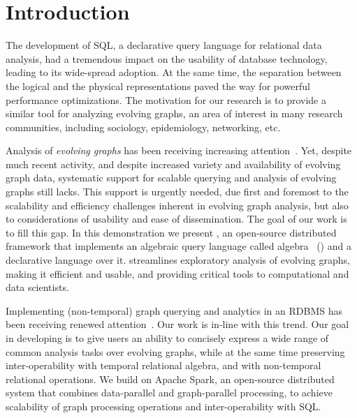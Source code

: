 \section{Introduction}
\label{sec:intro}

The development of SQL, a declarative query language for relational
data analysis, had a tremendous impact on the usability of database
technology, leading to its wide-spread adoption. At the same time, the
separation between the logical and the physical representations paved
the way for powerful performance optimizations. The motivation for our
research is to provide a similar tool for analyzing evolving graphs,
an area of interest in many research communities, including sociology,
epidemiology, networking, etc.

Analysis of {\em evolving graphs} has been receiving increasing
attention~\cite{DBLP:journals/csur/AggarwalS14,Miao2015,Ren2011,Semertzidis2015}.
Yet, despite much recent activity, and despite increased variety and
availability of evolving graph data, systematic support for scalable
querying and analysis of evolving graphs still lacks.  This support is
urgently needed, due first and foremost to the scalability and
efficiency challenges inherent in evolving graph analysis, but also to
considerations of usability and ease of dissemination.  The goal of
our work is to fill this gap.  In this demonstration we present
\sys, an open-source distributed framework that implements an
algebraic query language called \tg algebra~\cite{PortalarXiv2016}
(\tga) and a declarative language \ql over it. \sys streamlines
exploratory analysis of evolving graphs, making it efficient and
usable, and providing critical tools to computational and data
scientists.

Implementing (non-temporal) graph querying and analytics in an RDBMS
has been receiving renewed
attention~\cite{DBLP:conf/sigmod/AbergerTOR16,DBLP:conf/sigmod/SunFSKHX15,DBLP:journals/pvldb/Xirogiannopoulos15}.
Our work is in-line with this trend.  Our goal in developing \sys is
to give users an ability to concisely express a wide range of common
analysis tasks over evolving graphs, while at the same time preserving
inter-operability with temporal relational algebra, and with
non-temporal relational operations.  We build on Apache Spark, an
open-source distributed system that combines data-parallel and
graph-parallel processing, to achieve scalability of graph processing
operations and inter-operability with SQL.

